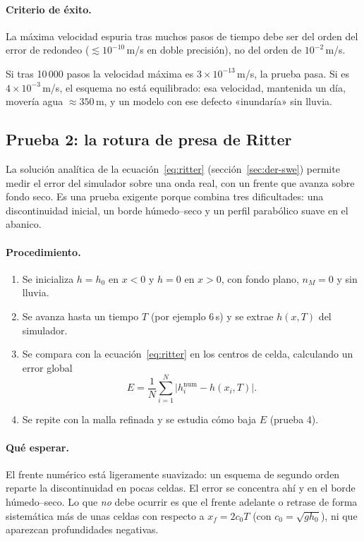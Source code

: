 \documentclass[11pt,a4paper]{article}
\begin{document}
\paragraph{Criterio de éxito.} La máxima velocidad espuria tras muchos pasos de tiempo debe ser del orden del
error de redondeo ($\lesssim10^{-10}$\,m/s en doble precisión), no del orden de $10^{-2}$\,m/s.

\begin{ejemplo}
Si tras 10\,000 pasos la velocidad máxima es $3\times10^{-13}$\,m/s, la prueba pasa. Si es $4\times10^{-3}$\,m/s,
el esquema no está equilibrado: esa velocidad, mantenida un día, movería agua $\approx350$\,m, y un modelo con
ese defecto «inundaría» sin lluvia.
\end{ejemplo}

\subsection{Prueba 2: la rotura de presa de Ritter}

La solución analítica de la ecuación~\eqref{eq:ritter} (sección~\ref{sec:der-swe}) permite medir el error del
simulador sobre una onda real, con un frente que avanza sobre fondo seco. Es una prueba exigente porque
combina tres dificultades: una discontinuidad inicial, un borde húmedo--seco y un perfil parabólico suave en
el abanico.

\paragraph{Procedimiento.}
\begin{enumerate}
  \item Se inicializa $h=h_0$ en $x<0$ y $h=0$ en $x>0$, con fondo plano, $n_M=0$ y sin lluvia.
  \item Se avanza hasta un tiempo $T$ (por ejemplo 6\,s) y se extrae $h(x,T)$ del simulador.
  \item Se compara con la ecuación~\eqref{eq:ritter} en los centros de celda, calculando un error global
        \[
          E=\frac{1}{N}\sum_{i=1}^{N}\bigl|h_i^{\text{num}}-h(x_i,T)\bigr| .
        \]
  \item Se repite con la malla refinada y se estudia cómo baja $E$ (prueba 4).
\end{enumerate}

\paragraph{Qué esperar.} El frente numérico está ligeramente suavizado: un esquema de segundo orden reparte la
discontinuidad en pocas celdas. El error se concentra ahí y en el borde húmedo--seco. Lo que \emph{no} debe
ocurrir es que el frente adelante o retrase de forma sistemática más de unas celdas con respecto a
$x_f=2c_0T$ (con $c_0=\sqrt{gh_0}$), ni que aparezcan profundidades negativas.
\end{document}
